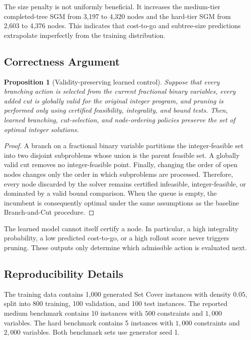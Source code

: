 \documentclass{article}
\newtheorem{proposition}{Proposition}
\begin{document}
The size penalty is not uniformly beneficial. It increases the medium-tier completed-tree SGM from 3,197 to 4,320 nodes and the hard-tier SGM from 2,603 to 4,376 nodes. This indicates that cost-to-go and subtree-size predictions extrapolate imperfectly from the training distribution.

\subsection{Correctness Argument}
\label{app:correctness}

\begin{proposition}[Validity-preserving learned control]
\label{prop:appendix-correctness}
Suppose that every branching action is selected from the current fractional binary variables, every added cut is globally valid for the original integer program, and pruning is performed only using certified feasibility, integrality, and bound tests. Then, learned branching, cut-selection, and node-ordering policies preserve the set of optimal integer solutions. 
\end{proposition}

\begin{proof}
A branch on a fractional binary variable partitions the integer-feasible set into two disjoint subproblems whose union is the parent feasible set. A globally valid cut removes no integer-feasible point. Finally, changing the order of open nodes changes only the order in which subproblems are processed. Therefore, every node discarded by the solver remains certified infeasible, integer-feasible, or dominated by a valid bound comparison. When the queue is empty, the incumbent is consequently optimal under the same assumptions as the baseline Branch-and-Cut procedure.
\end{proof}

The learned model cannot itself certify a node. In particular, a high integrality probability, a low predicted cost-to-go, or a high rollout score never triggers pruning. These outputs only determine which admissible action is evaluated next.

\subsection{Reproducibility Details}
\label{app:reproducibility}

The training data contains 1,000 generated Set Cover instances with density $0.05$, split into 800 training, 100 validation, and 100 test instances. The reported medium benchmark contains 10 instances with $500$ constraints and $1{,}000$ variables. The hard benchmark contains 5 instances with $1{,}000$ constraints and $2{,}000$ variables. Both benchmark sets use generator seed 1.
\end{document}
